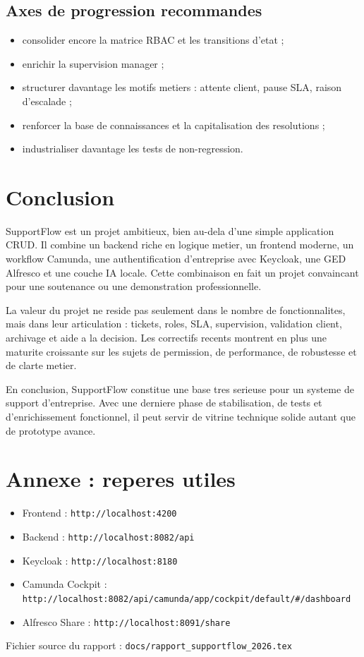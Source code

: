 \documentclass[12pt,a4paper]{article}
\begin{document}
\subsection{Axes de progression recommandes}

\begin{itemize}[leftmargin=1.2cm]
  \item consolider encore la matrice RBAC et les transitions d'etat ;
  \item enrichir la supervision manager ;
  \item structurer davantage les motifs metiers : attente client, pause SLA, raison d'escalade ;
  \item renforcer la base de connaissances et la capitalisation des resolutions ;
  \item industrialiser davantage les tests de non-regression.
\end{itemize}

\section{Conclusion}

SupportFlow est un projet ambitieux, bien au-dela d'une simple application CRUD. Il combine un backend riche en logique metier, un frontend moderne, un workflow Camunda, une authentification d'entreprise avec Keycloak, une GED Alfresco et une couche IA locale. Cette combinaison en fait un projet convaincant pour une soutenance ou une demonstration professionnelle.

La valeur du projet ne reside pas seulement dans le nombre de fonctionnalites, mais dans leur articulation : tickets, roles, SLA, supervision, validation client, archivage et aide a la decision. Les correctifs recents montrent en plus une maturite croissante sur les sujets de permission, de performance, de robustesse et de clarte metier.

En conclusion, SupportFlow constitue une base tres serieuse pour un systeme de support d'entreprise. Avec une derniere phase de stabilisation, de tests et d'enrichissement fonctionnel, il peut servir de vitrine technique solide autant que de prototype avance.

\section*{Annexe : reperes utiles}

\begin{itemize}[leftmargin=1.2cm]
  \item Frontend : \texttt{http://localhost:4200}
  \item Backend : \texttt{http://localhost:8082/api}
  \item Keycloak : \texttt{http://localhost:8180}
  \item Camunda Cockpit : \texttt{http://localhost:8082/api/camunda/app/cockpit/default/\#/dashboard}
  \item Alfresco Share : \texttt{http://localhost:8091/share}
\end{itemize}

\vspace{0.4cm}
\noindent
Fichier source du rapport : \texttt{docs/rapport\_supportflow\_2026.tex}
\end{document}
